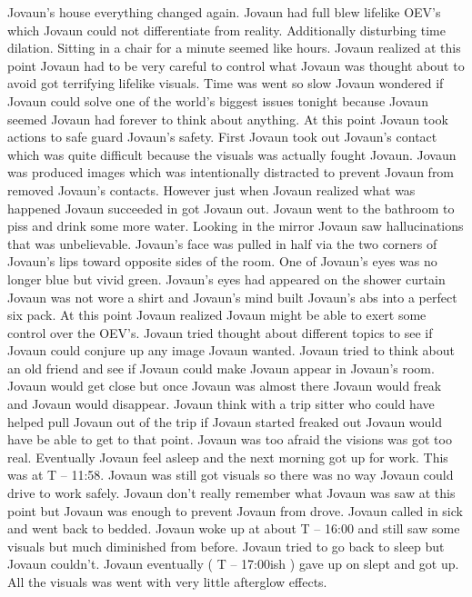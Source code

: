 \documentclass[12pt]{book}
\begin{document}
Jovaun's house everything changed again. Jovaun had full blew lifelike OEV's which Jovaun could not differentiate from reality. Additionally disturbing time dilation. Sitting in a chair for a minute seemed like hours. Jovaun realized at this point Jovaun had to be very careful to control what Jovaun was thought about to avoid got terrifying lifelike visuals. Time was went so slow Jovaun wondered if Jovaun could solve one of the world's biggest issues tonight because Jovaun seemed Jovaun had forever to think about anything. At this point Jovaun took actions to safe guard Jovaun's safety. First Jovaun took out Jovaun's contact which was quite difficult because the visuals was actually fought Jovaun. Jovaun was produced images which was intentionally distracted to prevent Jovaun from removed Jovaun's contacts. However just when Jovaun realized what was happened Jovaun succeeded in got Jovaun out. Jovaun went to the bathroom to piss and drink some more water. Looking in the mirror Jovaun saw hallucinations that was unbelievable. Jovaun's face was pulled in half via the two corners of Jovaun's lips toward opposite sides of the room. One of Jovaun's eyes was no longer blue but vivid green. Jovaun's eyes had appeared on the shower curtain Jovaun was not wore a shirt and Jovaun's mind built Jovaun's abs into a perfect six pack. At this point Jovaun realized Jovaun might be able to exert some control over the OEV's. Jovaun tried thought about different topics to see if Jovaun could conjure up any image Jovaun wanted. Jovaun tried to think about an old friend and see if Jovaun could make Jovaun appear in Jovaun's room. Jovaun would get close but once Jovaun was almost there Jovaun would freak and Jovaun would disappear. Jovaun think with a trip sitter who could have helped pull Jovaun out of the trip if Jovaun started freaked out Jovaun would have be able to get to that point. Jovaun was too afraid the visions was got too real. Eventually Jovaun feel asleep and the next morning got up for work. This was at T -- 11:58. Jovaun was still got visuals so there was no way Jovaun could drive to work safely. Jovaun don't really remember what Jovaun was saw at this point but Jovaun was enough to prevent Jovaun from drove. Jovaun called in sick and went back to bedded. Jovaun woke up at about T -- 16:00 and still saw some visuals but much diminished from before. Jovaun tried to go back to sleep but Jovaun couldn't. Jovaun eventually ( T -- 17:00ish ) gave up on slept and got up. All the visuals was went with very little afterglow effects.
\end{document}
